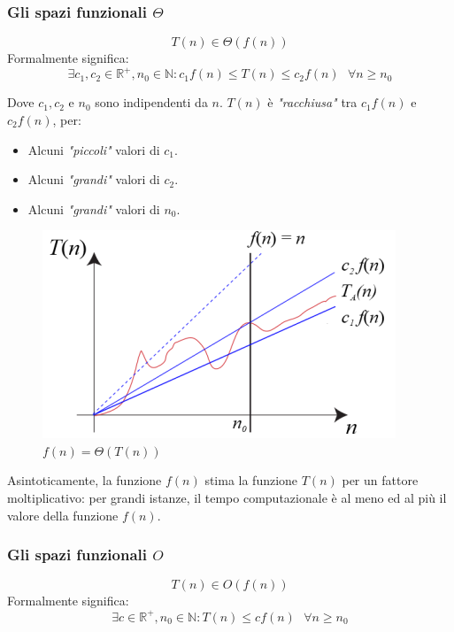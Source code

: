 \documentclass{article}
\begin{document}
\subsubsection{\texorpdfstring{Gli spazi funzionali $\Theta$}{Gli spazi funzionali}}
$$T(n) \in \Theta (f (n))$$
Formalmente significa:
$$\exists c_1, c_2 \in \mathbb{R}^+, n_0 \in \mathbb{N} : c_1 f(n) \leq T(n) \leq c_2 f(n)
    \text{  }\forall n\geq n_0$$

Dove $c_1,c_2$ e $n_0$ sono indipendenti da $n$. $T(n)$ è \textit{"racchiusa"} tra
$c_1 f(n)$ e $c_2 f(n)$, per:

\begin{itemize}
    \item Alcuni \textit{"piccoli"} valori di $c_1$.
    \item Alcuni \textit{"grandi"} valori di $c_2$.
    \item Alcuni \textit{"grandi"} valori di $n_0$.
\end{itemize}

\begin{figure}[H]
    \centering
    \includegraphics[scale=0.8]{images/theta.png}
    \caption{$f(n)=\Theta(T(n))$}
\end{figure}
Asintoticamente, la funzione $f(n)$ stima la funzione $T(n)$ per un fattore moltiplicativo:
per grandi istanze, il tempo computazionale è al meno ed al più il valore della funzione $f(n)$.

\subsubsection{\texorpdfstring{Gli spazi funzionali $O$}{}}
$$T (n) \in O (f (n))$$
Formalmente significa:
$$\exists c \in \mathbb{R}^+, n_0 \in \mathbb{N} : T(n) \leq c f(n) \text{  }\forall n \geq n_0$$
\end{document}
